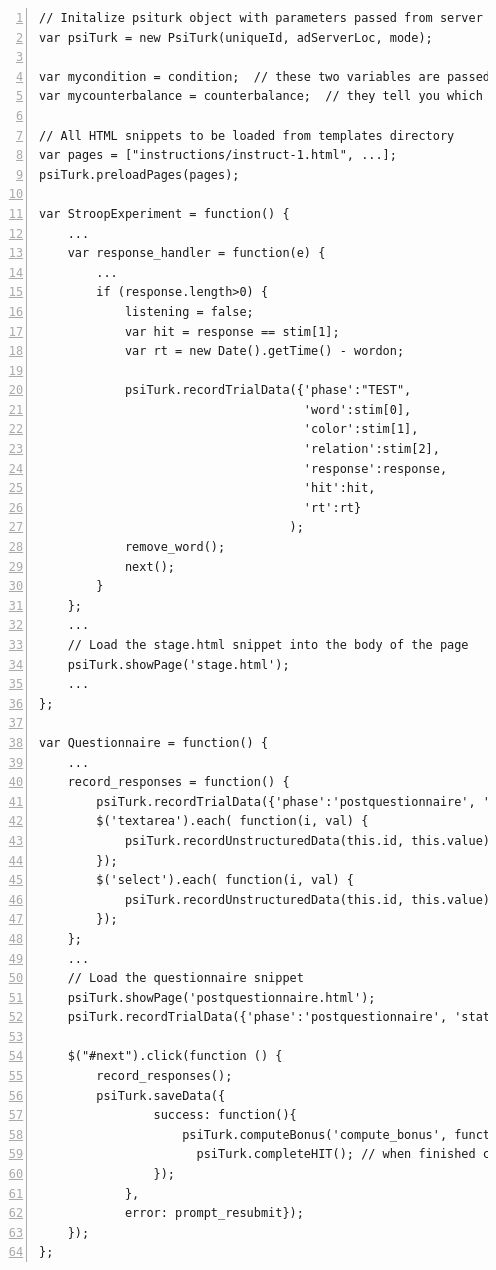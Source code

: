 \documentclass[twocolumn]{svjour3}          %
\begin{document}
\begin{lstlisting}[float=*,numbers=left,numberstyle=\small\color{gray},caption=Condensed version of javascript code for Stroop experiment,label=code.lst]
// Initalize psiturk object with parameters passed from server (see templates/exp.html)
var psiTurk = new PsiTurk(uniqueId, adServerLoc, mode);

var mycondition = condition;  // these two variables are passed by the psiturk server process
var mycounterbalance = counterbalance;  // they tell you which condition you have been assigned to

// All HTML snippets to be loaded from templates directory
var pages = ["instructions/instruct-1.html", ...];
psiTurk.preloadPages(pages);

var StroopExperiment = function() {
	...	
	var response_handler = function(e) {
		...
		if (response.length>0) {
			listening = false;
			var hit = response == stim[1];
			var rt = new Date().getTime() - wordon;

			psiTurk.recordTrialData({'phase':"TEST",
                                     'word':stim[0],
                                     'color':stim[1],
                                     'relation':stim[2],
                                     'response':response,
                                     'hit':hit,
                                     'rt':rt}
                                   );
			remove_word();
			next();
		}
	};
	...	
	// Load the stage.html snippet into the body of the page
	psiTurk.showPage('stage.html');
	...
};

var Questionnaire = function() {
	...
	record_responses = function() {
		psiTurk.recordTrialData({'phase':'postquestionnaire', 'status':'submit'});
		$('textarea').each( function(i, val) {
			psiTurk.recordUnstructuredData(this.id, this.value);
		});
		$('select').each( function(i, val) {
			psiTurk.recordUnstructuredData(this.id, this.value);		
		});
	};
	... 
	// Load the questionnaire snippet 
	psiTurk.showPage('postquestionnaire.html');
	psiTurk.recordTrialData({'phase':'postquestionnaire', 'status':'begin'});
	
	$("#next").click(function () {
	    record_responses();
	    psiTurk.saveData({
            	success: function(){
                	psiTurk.computeBonus('compute_bonus', function() { 
                	  psiTurk.completeHIT(); // when finished computing bonus, quit
                }); 
            }, 
            error: prompt_resubmit});
	});
};
\end{lstlisting}
\end{document}

